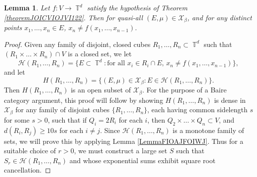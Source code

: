 \documentclass[dvipsnames,letterpaper,12pt]{article}
\numberwithin{equation}{section}
\DeclareMathOperator{\TT}{\mathbb{T}}
\newtheorem{lemma}[theorem]{Lemma}
\numberwithin{theorem}{section}
\begin{document}
\begin{lemma} \label{lemmaOIOICJOIJOISJOIJS}
    Let $f: V \to \TT^d$ satisfy the hypothesis of Theorem \ref{theoremJOICVIOJVI122}. Then for quasi-all $(E,\mu) \in \mathcal{X}_\beta$, and for any distinct points $x_1,\dots,x_n \in E$, $x_n \neq f(x_1,\dots,x_{n-1})$.
\end{lemma}
\begin{proof}
    Given any family of disjoint, closed cubes $R_1,\dots,R_n \subset \TT^d$ such that $(R_1 \times \dots \times R_n) \cap V$ is a closed set, we let
    \[ \mathcal{H}(R_1,\dots,R_n) = \{ E \subset \TT^d: \text{for all $x_i \in R_i \cap E$, $x_n \neq f(x_1,\dots,x_{n-1})$} \}, \]
    and let
    \[ H(R_1,\dots,R_n) = \{ (E,\mu) \in \mathcal{X}_\beta: E \in \mathcal{H}(R_1,\dots,R_n) \}. \]
    Then $H(R_1,\dots,R_n)$ is an open subset of $\mathcal{X}_\beta$. For the purpose of a Baire category argument, this proof will follow by showing $H(R_1,\dots,R_n)$ is dense in $\mathcal{X}_\beta$ for any family of disjoint cubes $\{ R_1,\dots, R_n \}$, each having common sidelength $s$ for some $s > 0$, such that if $Q_i = 2R_i$ for each $i$, then $Q_2 \times \dots \times Q_n \subset V$, and $d(R_i,R_j) \geq 10s$ for each $i \neq j$. Since $\mathcal{H}(R_1,\dots,R_n)$ is a monotone family of sets, we will prove this by applying Lemma \ref{LemmaFIOAJFOIWJ}. Thus for a suitable choice of $r > 0$, we must construct a large set $S$ such that $S_r \in \mathcal{H}(R_1,\dots,R_n)$ and whose exponential sums exhibit square root cancellation.


\end{proof}
\end{document}
